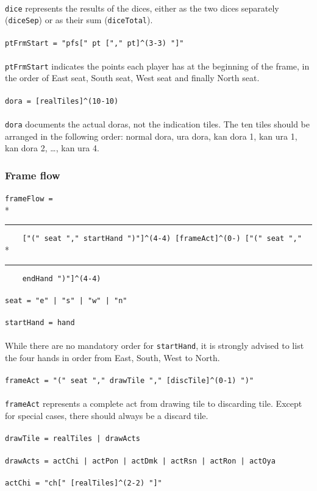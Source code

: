 \documentclass[%
	a4paper%
	,10pt%
	,twoside%
	,notitlepage%
]{article}%
\newcommand*{\ruleSymbol}{\textjapanese{⚠}}%
\newcommand*{\ruleMargin}{\marginpar{\flushright{}\ruleSymbol{}}}%
\newcommand*{\rulePar}{\paragraph*{\ruleMargin{}}}%
\newcommand*{\indentRule}{\rule{10pt}{0pt}}%
\begin{document}
			\paragraph*{}\lstinline/dice/ represents the results of the dices, either as the two dices separately (\lstinline/diceSep/) or as their sum (\lstinline/diceTotal/). %
			\rulePar{}\lstinline/ptFrmStart = "pfs[" pt ["," pt]^(3-3) "]"/%
			\paragraph*{}\lstinline/ptFrmStart/ indicates the points each player has at the beginning of the frame, in the order of East seat, South seat, West seat and finally North seat. %
			\rulePar{}\lstinline/dora = [realTiles]^(10-10)/%
			\paragraph*{}\lstinline/dora/ documents the actual doras, not the indication tiles. The ten tiles should be arranged in the following order: normal dora, ura dora, kan dora 1, kan ura 1, kan dora 2, \dots{}, kan ura 4. %
		\subsubsection{Frame flow}\label{subsubsec:frmflow}%
			\rulePar{}\lstinline/frameFlow = /\\*{}%
			\indentRule{}\lstinline/    ["(" seat "," startHand ")"]^(4-4) [frameAct]^(0-) ["(" seat "," /\\*{}%
			\indentRule{}\lstinline/    endHand ")"]^(4-4)/%
			\rulePar{}\lstinline/seat = "e" | "s" | "w" | "n"/%
			\rulePar{}\lstinline/startHand = hand/%
			\paragraph*{}While there are no mandatory order for \lstinline/startHand/, it is strongly advised to list the four hands in order from East, South, West to North. %
			\rulePar{}\lstinline/frameAct = "(" seat "," drawTile "," [discTile]^(0-1) ")"/%
			\paragraph*{}\lstinline/frameAct/ represents a complete act from drawing tile to discarding tile. Except for special cases, there should always be a discard tile. %
			\rulePar{}\lstinline/drawTile = realTiles | drawActs/%
			\rulePar{}\lstinline/drawActs = actChi | actPon | actDmk | actRsn | actRon | actOya /%
			\rulePar{}\lstinline/actChi = "ch[" [realTiles]^(2-2) "]"/%
\end{document}
